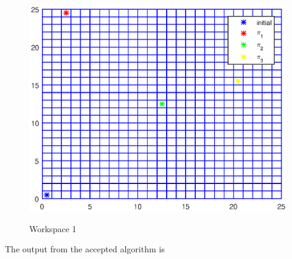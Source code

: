 \begin{figure}[!htb]
\centering
\includegraphics[scale=0.8]{workspace.eps}
\label{fig:workspace}
\caption{Workspace 1}
\end{figure}


The output from the accepted algorithm is \\


